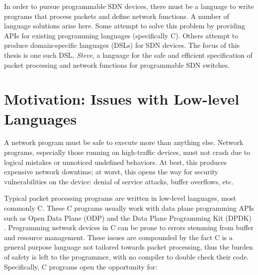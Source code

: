 In order to pursue programmable SDN devices, there must be a language to write
programs that process packets and define network functions. 
A number of language solutions arise here.
Some attempt to solve this problem by providing APIs for existing programming languages (specifically C).
Others attempt to produce domain-specific languages (DSLs) for SDN devices.
The focus of this thesis is one such DSL, \emph{Steve}, a language for the safe and
efficient specification of packet processing and network functions 
for programmable SDN switches.

%
%


\section{Motivation: Issues with Low-level Languages}

A network program must be safe to execute more than anything else.
Network programs, especially those running on high-traffic devices, must not
crash due to logical mistakes or unnoticed undefined behaviors.
At best, this produces expensive network downtime; at worst, this
opens the way for security vulnerabilities on the device: 
denial of service attacks, buffer overflows, etc.

Typical packet processing programs are written in low-level languages, most
commonly C. These C programs usually work with data plane programming APIs such
as Open Data Plane (ODP) \cite{odp_webpage} and the Data Plane Programming Kit
(DPDK) \cite{dpdk_webpage}. Programming network devices in C can be prone
to errors stemming from buffer and resource management. 
These issues are compounded by the fact C is a general
purpose language not tailored towards packet processing, thus the burden of safety
is left to the programmer, with no compiler to double check their code.
Specifically, C programs open the opportunity for:

